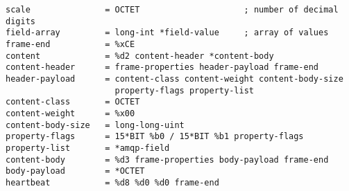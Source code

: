 \begin{verbatim}
scale               = OCTET                     ; number of decimal digits
field-array         = long-int *field-value     ; array of values
frame-end           = %xCE 
content             = %d2 content-header *content-body 
content-header      = frame-properties header-payload frame-end 
header-payload      = content-class content-weight content-body-size 
                      property-flags property-list 
content-class       = OCTET 
content-weight      = %x00 
content-body-size   = long-long-uint 
property-flags      = 15*BIT %b0 / 15*BIT %b1 property-flags 
property-list       = *amqp-field 
content-body        = %d3 frame-properties body-payload frame-end 
body-payload        = *OCTET 
heartbeat           = %d8 %d0 %d0 frame-end                    
\end{verbatim}